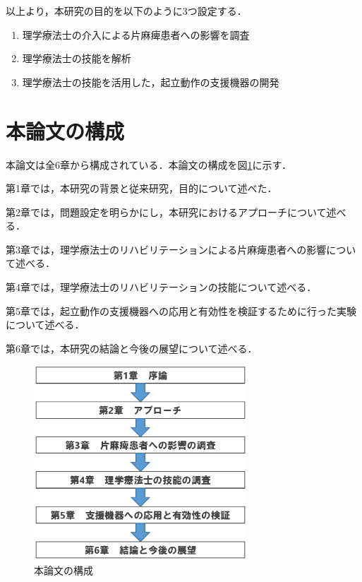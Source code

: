 以上より，本研究の目的を以下のように3つ設定する．
		\begin{enumerate}
			\item 理学療法士の介入による片麻痺患者への影響を調査
			\item 理学療法士の技能を解析
			\item 理学療法士の技能を活用した，起立動作の支援機器の開発
		\end{enumerate}





\clearpage


\section{本論文の構成}

本論文は全6章から構成されている．本論文の構成を図\ref{fig:thesis_flow}に示す．

第1章では，本研究の背景と従来研究，目的について述べた．

第2章では，問題設定を明らかにし，本研究におけるアプローチについて述べる．

第3章では，理学療法士のリハビリテーションによる片麻痺患者への影響について述べる．

第4章では，理学療法士のリハビリテーションの技能について述べる．

第5章では，起立動作の支援機器への応用と有効性を検証するために行った実験について述べる．

第6章では，本研究の結論と今後の展望について述べる．



\begin{figure}[b]
\begin{center}
\includegraphics[width=8cm]{./Chap1/fig/thesis_flow.eps}
\caption{本論文の構成}
\label{fig:thesis_flow}
\end{center}
\end{figure}

\clearpage



